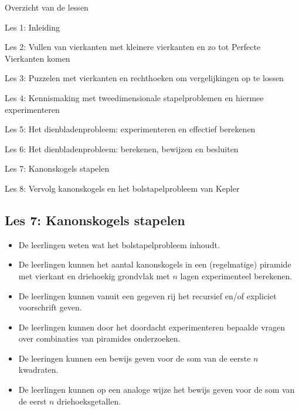 \documentclass[dutch]{beamer}
\begin{document}
\begin{frame}
{Overzicht van de lessen}
\begin{list}{\quad}{}
\item Les 1: Inleiding
\item Les 2: Vullen van vierkanten met kleinere vierkanten en zo tot Perfecte Vierkanten komen
\item Les 3: Puzzelen met vierkanten en rechthoeken om vergelijkingen op te lossen
\item Les 4: Kennismaking met tweedimensionale stapelproblemen en hiermee experimenteren
\item Les 5: Het dienbladenprobleem: experimenteren en effectief berekenen
\item Les 6: Het dienbladenprobleem: berekenen, bewijzen en besluiten
\item {\color{blue}Les 7: Kanonskogels stapelen}
\item Les 8: Vervolg kanonskogels en het bolstapelprobleem van Kepler
\end{list}
\end{frame}

\subsection{Les 7: Kanonskogels stapelen}

\begin{frame}
\begin{itemize}
\item De leerlingen weten wat het bolstapelprobleem inhoudt.
\item De leerlingen kunnen het aantal kanonskogels in een (regelmatige) piramide met vierkant en driehoekig grondvlak met $n$ lagen experimenteel berekenen.
\item De leerlingen kunnen vanuit een gegeven rij het recursief en/of expliciet voorschrift geven.
\item De leerlingen kunnen door het doordacht experimenteren bepaalde vragen over combinaties van piramides onderzoeken.
\item De leeringen kunnen een bewijs geven voor de som van de eerste $n$ kwadraten.
\item De leerlingen kunnen op een analoge wijze het bewijs geven voor de som van de eerst $n$ driehoeksgetallen.
\end{itemize}
\end{frame}
\end{document}
